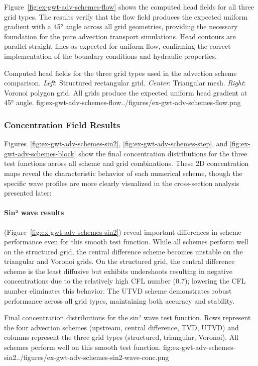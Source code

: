 Figure~\ref{fig:ex-gwt-adv-schemes-flow} shows the computed head fields for all three grid types. The results verify that the flow field produces the expected uniform gradient with a 45° angle across all grid geometries, providing the necessary foundation for the pure advection transport simulations. Head contours are parallel straight lines as expected for uniform flow, confirming the correct implementation of the boundary conditions and hydraulic properties.

\begin{StandardFigure}{
    Computed head fields for the three grid types used in the advection scheme comparison. \textit{Left}: Structured rectangular grid. \textit{Center}: Triangular mesh. \textit{Right}: Voronoi polygon grid. All grids produce the expected uniform head gradient at 45° angle.
}{fig:ex-gwt-adv-schemes-flow}{../figures/ex-gwt-adv-schemes-flow.png}
\end{StandardFigure}

\subsubsection{Concentration Field Results}

Figures~\ref{fig:ex-gwt-adv-schemes-sin2}, \ref{fig:ex-gwt-adv-schemes-step}, and \ref{fig:ex-gwt-adv-schemes-block} show the final concentration distributions for the three test functions across all scheme and grid combinations. These 2D concentration maps reveal the characteristic behavior of each numerical scheme, though the specific wave profiles are more clearly visualized in the cross-section analysis presented later:

\paragraph{Sin² wave results} (Figure~\ref{fig:ex-gwt-adv-schemes-sin2}) reveal important differences in scheme performance even for this smooth test function. While all schemes perform well on the structured grid, the central difference scheme becomes unstable on the triangular and Voronoi grids. On the structured grid, the central difference scheme is the least diffusive but exhibits undershoots resulting in negative concentrations due to the relatively high CFL number (0.7); lowering the CFL number eliminates this behavior. The UTVD scheme demonstrates robust performance across all grid types, maintaining both accuracy and stability.
\begin{StandardFigure}{
    Final concentration distributions for the sin² wave test function. Rows represent the four advection schemes (upstream, central difference, TVD, UTVD) and columns represent the three grid types (structured, triangular, Voronoi). All schemes perform well on this smooth test function.
}{fig:ex-gwt-adv-schemes-sin2}{../figures/ex-gwt-adv-schemes-sin2-wave-conc.png}
\end{StandardFigure}

